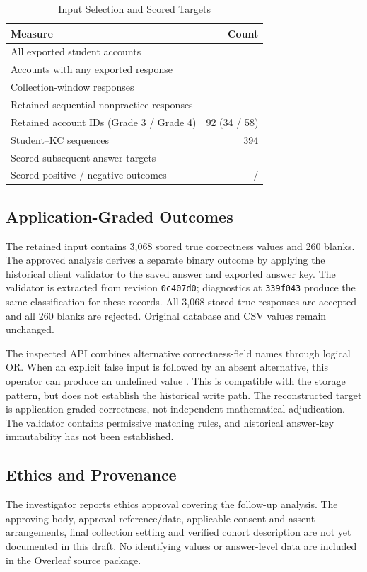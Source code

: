 \documentclass[conference]{IEEEtran}
\newif\ifworkingdraft
\newcommand{\draftnote}[1]{\ifworkingdraft\par\noindent\textcolor{red}{\textbf{Author review:} #1}\par\fi}
\begin{document}
\begin{table}[t]
\caption{Input Selection and Scored Targets}
\label{tab:data}
\centering
\begin{tabular}{lr}
\hline
Measure & Count \\
\hline
All exported student accounts & \AccountCount{} \\
Accounts with any exported response & \ActiveAccountCount{} \\
Collection-window responses & \CollectionResponseCount{} \\
Retained sequential nonpractice responses & \CandidateResponseCount{} \\
Retained account IDs (Grade 3 / Grade 4) & 92 (34 / 58) \\
Student--KC sequences & 394 \\
Scored subsequent-answer targets & \ScoredTargets{} \\
Scored positive / negative outcomes & \ScoredPositive{} / \ScoredNegative{} \\
\hline
\end{tabular}
\end{table}

\subsection{Application-Graded Outcomes}
The retained input contains 3,068 stored true correctness values and 260 blanks. The approved analysis derives a separate binary outcome by applying the historical client validator to the saved answer and exported answer key. The validator is extracted from revision \texttt{0c407d0}; diagnostics at \texttt{339f043} produce the same classification for these records. All 3,068 stored true responses are accepted and all 260 blanks are rejected. Original database and CSV values remain unchanged.

The inspected API combines alternative correctness-field names through logical OR. When an explicit false input is followed by an absent alternative, this operator can produce an undefined value \cite{mdnOR}. This is compatible with the storage pattern, but does not establish the historical write path. The reconstructed target is application-graded correctness, not independent mathematical adjudication. The validator contains permissive matching rules, and historical answer-key immutability has not been established.

\subsection{Ethics and Provenance}
The investigator reports ethics approval covering the follow-up analysis. The approving body, approval reference/date, applicable consent and assent arrangements, final collection setting and verified cohort description are not yet documented in this draft. No identifying values or answer-level data are included in the Overleaf source package.
\draftnote{Insert the actual ethics and collection details, and verify account eligibility against authorized records where available. Confirm the relationship between these student records and the earlier teacher evaluation and any other publications.}
\end{document}
